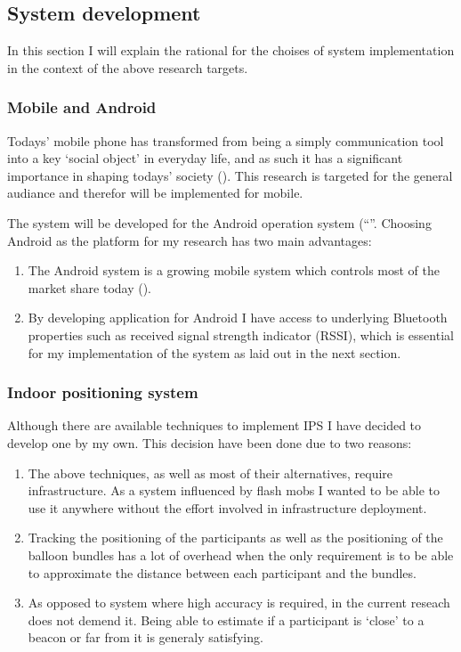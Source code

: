 \documentclass[a4paper,11pt]{article}
\begin{document}
\subsection{System development}

In this section I will explain the rational for the choises of system implementation in the context of the above research targets.

\subsubsection{Mobile and Android}

Todays' mobile phone has transformed from being a simply communication tool into a key `social object' in everyday life, and as such it has a significant importance in shaping todays' society (\cite{srivastava05}).
This research is targeted for the general audiance and therefor will be implemented for mobile.

The system will be developed for the Android operation system (``''.
Choosing Android as the platform for my research has two main advantages:
\begin{enumerate}
	\item The Android system is a growing mobile system which controls most of the market share today ().
	\item By developing application for Android I have access to underlying Bluetooth properties such as received signal strength indicator (RSSI), which is essential for my implementation of the system as laid out in the next section.
\end{enumerate}

\subsubsection{Indoor positioning system}\label{methods:ips}

Although there are available techniques to implement IPS I have decided to develop one by my own.
This decision have been done due to two reasons:
\begin{enumerate}
	\item The above techniques, as well as most of their alternatives, require infrastructure.
	As a system influenced by flash mobs I wanted to be able to use it anywhere without the effort involved in infrastructure deployment.
	\item Tracking the positioning of the participants as well as the positioning of the balloon bundles has a lot of overhead when the only requirement is to be able to approximate the distance between each participant and the bundles.
	\item As opposed to system where high accuracy is required, in the current reseach does not demend it.
	Being able to estimate if a participant is `close' to a beacon or far from it is generaly satisfying.
\end{enumerate}
\end{document}

